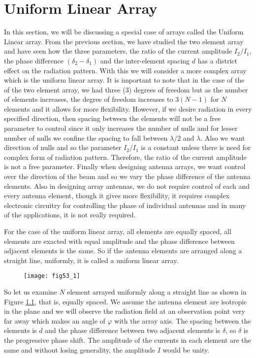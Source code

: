 \chapter{Uniform Linear Array}
In this section, we will be discussing a special case of arrays called the Uniform Linear array. From the previous section, we have studied the two element array and have seen how the three parameters, the ratio of the current amplitude $I_{2} / I_{1}$, the phase difference $\left(\delta_2 - \delta_1\right)$ and the inter-element spacing $d$ has a district effect on the radiation pattern. With this we will consider a more complex array which is the uniform linear array. It is important to note that in the case of the of the two element array, we had three (3) degrees of freedom but as the number of elements increases, the degree of freedom increases to $3(N -1)$ for $N$ elements and it allows for more flexibility. However, if we desire radiation in every specified direction, then spacing between the elements will not be a free parameter to control since it only increases the number of nulls and for lesser number of nulls we confine the spacing to fall between $\lambda/2$ and $\lambda$. Also we want direction of nulls and so the parameter $I_{2} / I_{1}$ is a constant unless there is need for complex form of radiation pattern. Therefore, the ratio of the current amplitude is not a free parameter. Finally when designing antenna arrays, we want control over the direction of the beam and so we vary the phase difference of the antenna elements. Also in designing array antennas, we do not require control of each and every antenna element, though it gives more flexibility, it requires complex electronic circuitry for controlling the phase of individual antennas and in many of the applications, it is not really required.

For the case of the uniform linear array, all elements are equally spaced, all elements are exacted with equal amplitude and the phase difference between adjacent elements is the same. So if the antenna elements are arranged along a straight line, uniformly, it is called a uniform linear array.
\begin{figure}
	\centering
	\texttt{[image: fig53\_1]}
	\caption{}
	\label{53.1}
	
\end{figure}

So let us examine $N$ element arrayed uniformly along a straight line as shown in Figure \ref{53.1}, that is, equally spaced. We assume the antenna element are isotropic in the plane and we will observe the radiation field at an observation point very far away which makes an angle of $\varphi$ with the array axis. The spacing between the elements is $d$ and the phase difference between two adjacent elements is $\delta$, so $\delta$ is the progressive phase shift. The amplitude of the currents in each element are the same and without losing generality, the amplitude $I$ would be unity.



